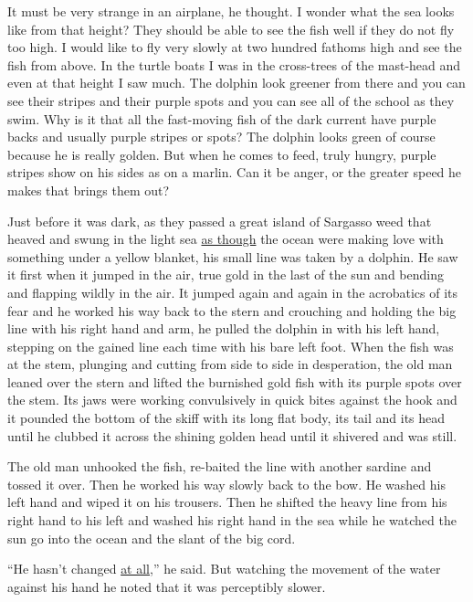 It must be very strange in an airplane, he thought. I wonder what the sea
looks like from that height? They should be able to see the fish well if
they do not fly too high. I would like to fly very slowly at two hundred
fathoms high and see the fish from above. In the turtle boats I was in the
cross-trees of the mast-head and even at that height I saw much. The dolphin
look greener from there and you can see their stripes and their purple \glspl{spot}
and you can see all of the school as they swim. Why is it that all the
fast-moving fish of the dark current have purple backs and usually purple
stripes or spots? The dolphin looks green of course because he is really
golden. But when he comes to feed, truly hungry, purple stripes show on his
sides as on a marlin. Can it be \gls{anger}, or the greater speed he makes
that brings them out?

Just before it was dark, as they passed a great island of Sargasso weed that
\gls{heaved} and swung in the light sea \uline{as though} the ocean were making love
with something under a yellow blanket, his small line was taken by a
dolphin. He saw it first when it jumped in the air, true gold in the last of
the sun and \gls{bending} and \gls{flapping} wildly in the air. It jumped
again and again in the \gls{acrobatics} of its \gls{fear} and he worked his
way back to the stern and \gls{crouching} and holding the big line with his
right hand and arm, he pulled the dolphin in with his left hand, stepping on
the gained line each time with his bare left foot. When the fish was at the
\gls{stem}, \gls{plunging} and cutting from side to side in
\gls{desperation}, the old man leaned over the stern and lifted the
\gls{burnished} gold fish with its purple spots over the stem. Its
\glspl{jaw} were working \gls{convulsively} in quick \glspl{bite} against the hook
and it pounded the bottom of the skiff with its long flat body, its tail and
its head until he \gls{clubbed} it across the shining golden head until it
shivered and was still.


The old man unhooked the fish, re-baited the line with another sardine and
\gls{tossed} it over. Then he worked his way slowly back to the bow. He washed his
left hand and wiped it on his trousers. Then he shifted the heavy line from
his right hand to his left and washed his right hand in the sea while he
watched the sun go into the ocean and the slant of the big cord.

``He hasn't changed \uline{at all},'' he said. But watching the movement of the
water against his hand he noted that it was \gls{perceptibly} slower.

